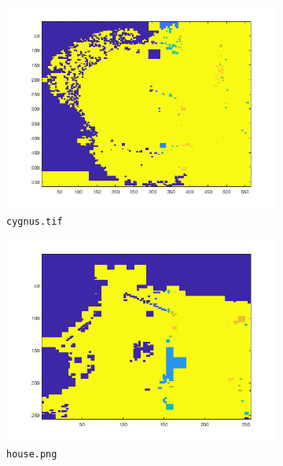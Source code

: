 \documentclass[a4paper]{article}
\begin{document}
\begin{figure}[H]
    \centering
     
    \begin{subfigure}[c]{0.6\textwidth}
        \centering
        \includegraphics[width=\textwidth]{images/ex2_cygnus.png}
        \caption{\texttt{cygnus.tif}}
    \label{subfig:ex2_cygnus}
    \end{subfigure}
    \begin{subfigure}[c]{0.6\textwidth}
        \centering
        \includegraphics[width=\textwidth]{images/ex2_house.png}
        \caption{\texttt{house.png}}
        \label{subfig:ex2_cygnus}
    \end{subfigure}
    \begin{subfigure}[c]{0.6\textwidth}

\end{subfigure}
\end{figure}
\end{document}
